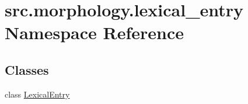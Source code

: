 \hypertarget{namespacesrc_1_1morphology_1_1lexical__entry}{\section{src.\+morphology.\+lexical\+\_\+entry Namespace Reference}
\label{namespacesrc_1_1morphology_1_1lexical__entry}
}
\subsection*{Classes}
\begin{DoxyCompactItemize}
\item 
class \hyperlink{classsrc_1_1morphology_1_1lexical__entry_1_1_lexical_entry}{Lexical\+Entry}
\end{DoxyCompactItemize}
